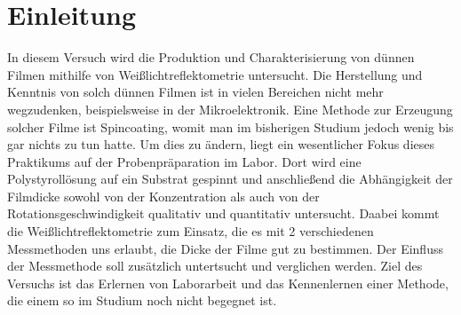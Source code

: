 \section{\label{sec:einleitung}Einleitung}
In diesem Versuch wird die Produktion und Charakterisierung von dünnen Filmen mithilfe von Weißlichtreflektometrie untersucht. Die Herstellung und Kenntnis von solch dünnen Filmen ist in vielen Bereichen nicht mehr wegzudenken, beispielsweise in der Mikroelektronik.
Eine Methode zur Erzeugung solcher Filme ist Spincoating, womit man im bisherigen Studium jedoch wenig bis gar nichts zu tun hatte. Um dies zu ändern, liegt ein wesentlicher Fokus dieses Praktikums auf der Probenpräparation im Labor. Dort wird eine Polystyrollösung auf ein Substrat gespinnt und anschließend die Abhängigkeit der Filmdicke sowohl von der Konzentration als auch von der Rotationsgeschwindigkeit qualitativ und quantitativ untersucht.
Daabei kommt die Weißlichtreflektometrie zum Einsatz, die es mit 2 verschiedenen Messmethoden uns erlaubt, die Dicke der Filme gut zu bestimmen. Der Einfluss der Messmethode soll zusätzlich untertsucht und verglichen werden. 
Ziel des Versuchs ist das Erlernen von Laborarbeit und das Kennenlernen einer Methode, die einem so im Studium noch nicht begegnet ist.